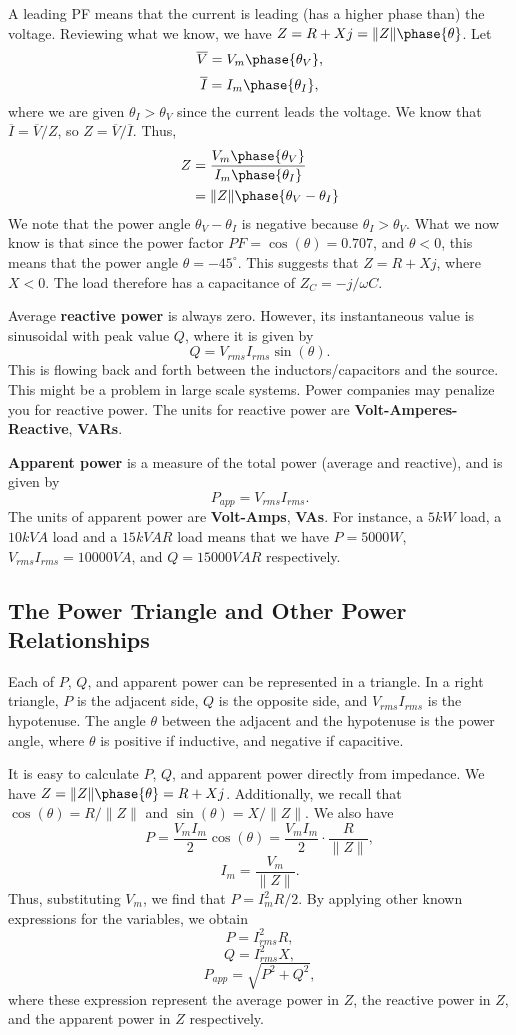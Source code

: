 \documentclass[11pt]{article}
\theoremstyle{plain} %
\theoremstyle{definition}
\theoremstyle{example}
\theoremstyle{remark}
\newcommand{\degree}{^{\circ}}
\begin{document}
A leading PF means that the current is leading (has a higher phase than) the voltage. Reviewing what we know, we have $Z=R+Xj = \|Z\|\phase{\theta}$. Let
$$\overline V = V_m\phase{\theta_V},$$
$$\overline I = I_m\phase{\theta_I},$$
where we are given $\theta_I > \theta_V$ since the current leads the voltage. We know that $\overline I = \overline V/Z$, so $Z = \overline V /\overline I$. Thus, 
\begin{align*}
	Z &= \frac{V_m\phase{\theta_V}}{I_m\phase{\theta_I}}\\
	&= \|Z\|\phase{\theta_V-\theta_I}
\end{align*}
We note that the power angle $\theta_V-\theta_I$ is negative because $\theta_I > \theta_V$. What we now know is that since the power factor $PF = \cos(\theta) = 0.707$, and $\theta<0$, this means that the power angle $\theta = -45\degree$. This suggests that $Z=R+Xj$, where $X<0$. The load therefore has a capacitance of $Z_C=-j/\omega C$. 

Average \textbf{reactive power} is always zero. However, its instantaneous value is sinusoidal with peak value $Q$, where it is given by
$$Q = V_{rms}I_{rms}\sin(\theta).$$
This is flowing back and forth between the inductors/capacitors and the source. This might be a problem in large scale systems. Power companies may penalize you for reactive power. The units for reactive power are \textbf{Volt-Amperes-Reactive}, \textbf{VARs}. 

\textbf{Apparent power} is a measure of the total power (average and reactive), and is given by 
$$P_{app} = V_{rms} I_{rms}.$$
The units of apparent power are \textbf{Volt-Amps}, \textbf{VAs}.
For instance, a $5kW$ load, a $10kVA$ load and a $15kVAR$ load means that we have $P=5000W$, $V_{rms}I_{rms} = 10000VA$, and $Q = 15000VAR$ respectively. 

\subsection{The Power Triangle and Other Power Relationships}

Each of $P$, $Q$, and apparent power can be represented in a triangle. In a right triangle, 
$P$ is the adjacent side, $Q$ is the opposite side, and $V_{rms}I_{rms}$ is the hypotenuse. The angle $\theta$ between the adjacent and the hypotenuse is the power angle, where $\theta$ is positive if inductive, and negative if capacitive. 

It is easy to calculate $P$, $Q$, and apparent power directly from impedance. We have $Z = \|Z\|\phase{\theta} = R+Xj$. Additionally, we recall that $\cos(\theta) = R/\|Z\|$ and $\sin(\theta) = X/\|Z\|$. We also have 
$$P =\frac{V_mI_m}{2}\cos(\theta) = \frac{V_mI_m}{2}\cdot \frac{R}{\|Z\|},$$
$$I_m = \frac{V_m}{\|Z\|}.$$
Thus, substituting $V_m$, we find that $P = I_m^2R/2$. By applying other known expressions for the variables, we obtain 
$$P = I_{rms}^2R,$$
$$Q = I_{rms}^2X,$$
$$P_{app} = \sqrt{P^2+Q^2},$$
where these expression represent the average power in $Z$, the reactive power in $Z$, and the apparent power in $Z$ respectively. 
\end{document}
